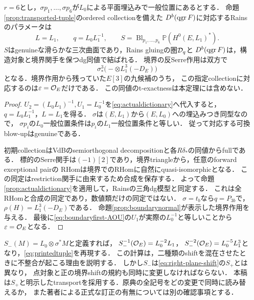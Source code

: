 \begin{theorem}[共通規約での具体的なgluing辞書]\label{thm:right-dictionary}
$r=6$とし，$\sigma p_1,\ldots,\sigma p_6$が$L_0$による平面埋込みで一般位置にあるとする．
命題\ref{prop:transported-tuple}のordered collectionを備えた
$D^b(\operatorname{qgr} F)$に対応するRainsのパラメータは
\begin{equation}\label{eq:right-dictionary}
 \boxed{L=L_1,\qquad q=L_0L_1^{-1},\qquad
 S=\operatorname{Bl}_{p_1,\ldots,p_6}\mathbb P(H^0(E,L_1)^*) .}
\end{equation}
$S$はgenuineな滑らかな三次曲面であり，Rains gluingの圏$\mathcal D_q$と
$D^b(\operatorname{qgr} F)$は，構造対象と境界関手を保つdg同値で結ばれる．
境界の反Serre作用は双方で
\[
 \sigma_*^3\bigl(-\otimes L_1^3(-D_E)\bigr)
\]
となる．境界作用から残っていた$E[3]$の九候補のうち，
この指定collectionに対応するのは$\varepsilon=\mathcal O_E$だけである．
この同値のt-exactnessは本定理には含めない．
\end{theorem}
\begin{proof}
$U_2=(L_0L_1)^{-1},U_1=L_0^{-1}$を\eqref{eq:actualdictionary}へ代入すると，
$q=L_0L_1^{-1}$，$L=L_1$を得る．
$\sigma$は$(E,L_1)$から$(E,L_0)$への埋込みつき同型なので，
$\sigma p_i$の$L_0$一般位置条件は$p_i$の$L_1$一般位置条件と等しい．
従って対応する可換blow-upはgenuineである．

初期collectionはVdBのsemiorthogonal decompositionと各$R\delta_*$の同値からfullである．
標的のSerre関手は$(-1)[2]$であり，境界triangleから，任意のforward exceptional pairの
RHomは境界でのRHomに自然にquasi-isomorphicとなる\cite[Proposition 9.3]{AOU}．
この同定はrestriction関手に由来するため合成を保存する．
よって命題\ref{prop:actualdictionary}を適用して，Rainsの三角dg模型と同定する．
これは全RHomと合成の同定であり，数値類だけの同定ではない．
$\sigma=t_b$なら$q=P_{3b}$で，$\rho(H)=L_1^3(-D_E)$である．
命題\ref{prop:boundarynormal}が表示した境界作用を与える．
最後に\eqref{eq:boundaryfirst-AOU}の$U_1$が実際の$L_0^{-1}$と等しいことから
$\varepsilon=\mathcal O_E$となる．
\end{proof}

\begin{remark}[印刷tupleが現れる別のshift]
$S_-(M)=L_0\otimes\sigma^*M$と定義すれば，
$S_-^{-1}(\mathcal O_E)=L_0^{-2}L_1$，
$S_-^{-2}(\mathcal O_E)=L_0^{-5}L_1^3$となり，\eqref{eq:printedtuple}を再現する．
この計算は，二種類のshiftを混在させたときに不整合が起こる理由を説明する．
しかし$S_-$は\eqref{eq:right-plane-shift}の$S_+$とは異なり，
点対象と正の境界shiftの規約も同時に変更しなければならない．
本稿は$S_+$と明示したtransportを採用する．原典の全記号をどの変更で同時に読み替えるか，
また著者による正式な訂正の有無については別の確認事項とする．
\end{remark}

